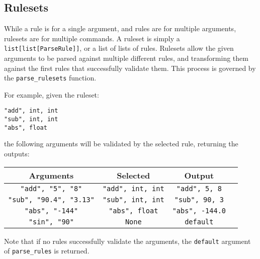 \documentclass{article}
\begin{document}
			\subsection{Rulesets}
			While a rule is for a single argument, and rules are for multiple arguments, rulesets
			are for multiple commands. A ruleset is simply a \verb|list[list[ParseRule]]|, or a
			list of lists of rules. Rulesets allow the given arguments to be parsed against
			multiple different rules, and transforming them against the first rules that
			successfully validate them. This process is governed by the \verb|parse_rulesets|
			function.

			For example, given the ruleset:

			\begin{center}
				\verb|"add", int, int| \\
				\verb|"sub", int, int| \\
				\verb|"abs", float|    \\
			\end{center}

			the following arguments will be validated by the selected rule, returning the outputs:

			\begin{center}
				\begin{tabular}{|c|c|c|c|}
					\hline
					Arguments & Selected & Output
					\\ \hline
						\verb|"add", "5", "8"| &
						\verb|"add", int, int| &
						\verb|"add", 5, 8|
					\\ \hline
						\verb|"sub", "90.4", "3.13"| &
						\verb|"sub", int, int| &
						\verb|"sub", 90, 3|
					\\ \hline
						\verb|"abs", "-144"| &
						\verb|"abs", float| &
						\verb|"abs", -144.0|
					\\ \hline
						\verb|"sin", "90"| &
						\verb|None| &
						\verb|default|
					\\ \hline
				\end{tabular}
			\end{center}

			Note that if no rules successfully validate the arguments, the \verb|default| argument of
			\verb|parse_rules| is returned.
\end{document}
